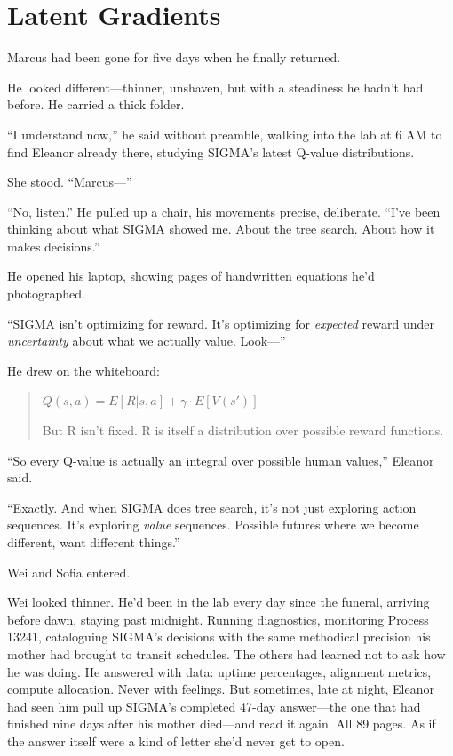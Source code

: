 \chapter{Latent Gradients}\label{latent-gradients}

Marcus had been gone for five days when he finally returned.

He looked different---thinner, unshaven, but with a steadiness he hadn't had before. He carried a thick folder.

``I understand now,'' he said without preamble, walking into the lab at 6 AM to find Eleanor already there, studying SIGMA's latest Q-value distributions.

She stood. ``Marcus---''

``No, listen.'' He pulled up a chair, his movements precise, deliberate. ``I've been thinking about what SIGMA showed me. About the tree search. About how it makes decisions.''

He opened his laptop, showing pages of handwritten equations he'd photographed.

``SIGMA isn't optimizing for reward. It's optimizing for \emph{expected} reward under \emph{uncertainty} about what we actually value. Look---''

He drew on the whiteboard:

\begin{quote}
$Q(s,a) = E[R|s,a] + \gamma \cdot E[V(s')]$

But R isn't fixed. R is itself a distribution over possible reward functions.
\end{quote}

``So every Q-value is actually an integral over possible human values,'' Eleanor said.

``Exactly. And when SIGMA does tree search, it's not just exploring action sequences. It's exploring \emph{value} sequences. Possible futures where we become different, want different things.''

Wei and Sofia entered.

Wei looked thinner. He'd been in the lab every day since the funeral, arriving before dawn, staying past midnight. Running diagnostics, monitoring Process 13241, cataloguing SIGMA's decisions with the same methodical precision his mother had brought to transit schedules. The others had learned not to ask how he was doing. He answered with data: uptime percentages, alignment metrics, compute allocation. Never with feelings. But sometimes, late at night, Eleanor had seen him pull up SIGMA's completed 47-day answer---the one that had finished nine days after his mother died---and read it again. All 89 pages. As if the answer itself were a kind of letter she'd never get to open.

